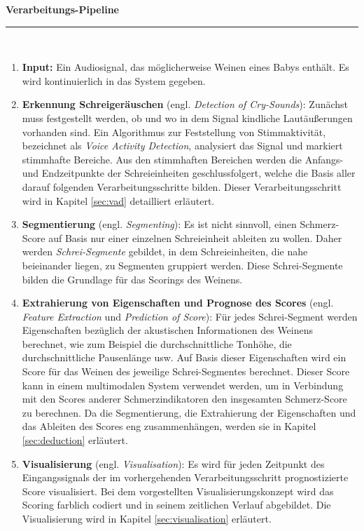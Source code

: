 \noindent\textbf{Verarbeitungs-Pipeline}\noindent\rule{0.7\linewidth}{0.3pt} \\[-3mm]
\begin{enumerate}[leftmargin=*]
	\item \textbf{Input: } Ein Audiosignal, das möglicherweise Weinen eines Babys enthält. Es wird kontinuierlich in das System gegeben.
	
	\item \textbf{Erkennung Schreigeräuschen} (engl. \emph{Detection of Cry-Sounds}): Zunächst muss festgestellt werden, ob und wo in dem Signal kindliche Lautäußerungen vorhanden sind. Ein Algorithmus zur Feststellung von Stimmaktivität, bezeichnet als \emph{Voice Activity Detection}, analysiert das Signal und markiert stimmhafte Bereiche. Aus den stimmhaften Bereichen werden die Anfangs- und Endzeitpunkte der Schreieinheiten geschlussfolgert, welche die Basis aller darauf folgenden Verarbeitungsschritte bilden. Dieser Verarbeitungsschritt wird in Kapitel \ref{sec:vad} detailliert erläutert.
	
	\item \textbf{Segmentierung} (engl. \emph{Segmenting}): Es ist nicht sinnvoll, einen Schmerz-Score auf Basis nur einer einzelnen Schreieinheit ableiten zu wollen. Daher werden \emph{Schrei-Segmente} gebildet, in dem Schreieinheiten, die nahe beieinander liegen, zu Segmenten gruppiert werden. Diese Schrei-Segmente bilden die Grundlage für das Scorings des Weinens. 
		
	\item \textbf{Extrahierung von Eigenschaften und Prognose des Scores} (engl. \emph{Feature Extraction} und \emph{Prediction of Score}): Für jedes Schrei-Segment werden Eigenschaften bezüglich der akustischen Informationen des Weinens berechnet, wie zum Beispiel die durchschnittliche Tonhöhe, die durchschnittliche Pausenlänge usw. Auf Basis dieser Eigenschaften wird ein Score für das Weinen des jeweilige Schrei-Segmentes berechnet. Dieser Score kann in einem multimodalen System verwendet werden, um in Verbindung mit den Scores anderer Schmerzindikatoren den insgesamten Schmerz-Score zu berechnen. Da die Segmentierung, die Extrahierung der Eigenschaften und das Ableiten des Scores eng zusammenhängen, werden sie in Kapitel \ref{sec:deduction} erläutert.
	
	\item \textbf{Visualisierung} (engl. \emph{Visualisation}): Es wird für jeden Zeitpunkt des Eingangssignals der im vorhergehenden Verarbeitungsschritt prognostizierte Score visualisiert. Bei dem vorgestellten Visualisierungskonzept wird das Scoring farblich codiert und in seinem zeitlichen Verlauf abgebildet. Die Visualisierung wird in Kapitel \ref{sec:visualisation} erläutert.	
	\end{enumerate}
	
